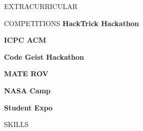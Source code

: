 \documentclass{resume}
\begin{document}
\begin{minipage}[t]{0.44\textwidth}
\begin{rsection}{\MakeUppercase{extracurricular}}
	\end{rsection}

	\begin{rsection}{\MakeUppercase{competitions}}
		{\bf HackTrick Hackathon} {} \hfill {}

		{\bf ICPC ACM} {} \hfill {}

		{\bf Code Geist Hackathon} {} \hfill {}

		{\bf MATE ROV} {} \hfill {}

		{\bf NASA Camp} {} \hfill {}

		{\bf Student Expo} { } \hfill {}

	\end{rsection}
	\begin{rfloat}{\MakeUppercase{skills}}
		\begin{techlist}
			\item {}
			\item {}
			\item {}
			\item {}
			\item {}
		\end{techlist}
	\end{rfloat}
		
	
	

\end{minipage}
\end{document}
